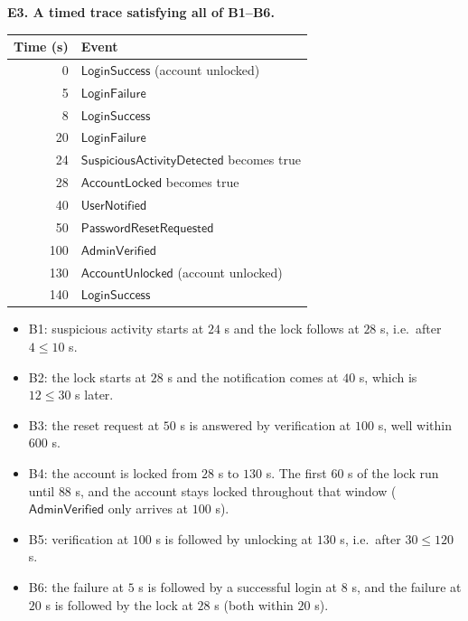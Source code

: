 \documentclass[a4paper, 11pt]{article}
\newcommand{\ap}[1]{\mathsf{#1}}
\newcommand{\LF}{\ap{LoginFailure}}
\newcommand{\LS}{\ap{LoginSuccess}}
\newcommand{\AL}{\ap{AccountLocked}}
\newcommand{\AU}{\ap{AccountUnlocked}}
\newcommand{\AV}{\ap{AdminVerified}}
\newcommand{\PR}{\ap{PasswordResetRequested}}
\newcommand{\UN}{\ap{UserNotified}}
\newcommand{\SA}{\ap{SuspiciousActivityDetected}}
\begin{document}
\begin{solution}
\medskip
{}
\noindent\textbf{E3. A timed trace satisfying all of B1--B6.}
\begin{center}
\begin{tabular}{r|l}
\hline
Time (s) & Event \\
\hline
0 & $\LS$ (account unlocked) \\
5 & $\LF$ \\
8 & $\LS$ \\
20 & $\LF$ \\
24 & $\SA$ becomes true \\
28 & $\AL$ becomes true \\
40 & $\UN$ \\
50 & $\PR$ \\
100 & $\AV$ \\
130 & $\AU$ (account unlocked) \\
140 & $\LS$ \\
\hline
\end{tabular}
\end{center}
\begin{itemize}
    \item B1: suspicious activity starts at $24$ s and the lock follows at $28$ s, i.e.\ after $4\le 10$ s.
    \item B2: the lock starts at $28$ s and the notification comes at $40$ s, which is $12\le 30$ s later.
    \item B3: the reset request at $50$ s is answered by verification at $100$ s, well within $600$ s.
    \item B4: the account is locked from $28$ s to $130$ s. The first $60$ s of the lock run until $88$ s, and the account stays locked throughout that window ($\AV$ only arrives at $100$ s).
    \item B5: verification at $100$ s is followed by unlocking at $130$ s, i.e.\ after $30\le 120$ s.
    \item B6: the failure at $5$ s is followed by a successful login at $8$ s, and the failure at $20$ s is followed by the lock at $28$ s (both within $20$ s).
\end{itemize}


\end{solution}
\end{document}
